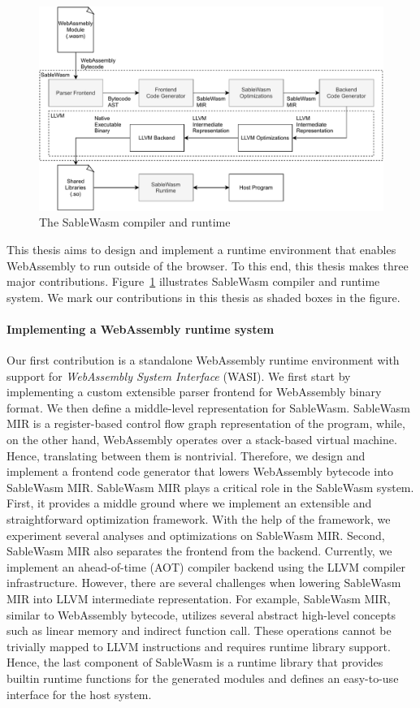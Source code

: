 \begin{figure}
    \centering
    \includegraphics[width=\textwidth]{Images/design}
    \caption{The SableWasm compiler and runtime}
    \label{fig:design}
\end{figure}

This thesis aims to design and implement a runtime environment that enables
WebAssembly to run outside of the browser. To this end, this thesis makes three
major contributions. Figure~\ref{fig:design} illustrates SableWasm compiler and
runtime system. We mark our contributions in this thesis as shaded boxes in the
figure.

\paragraph{Implementing a WebAssembly runtime system}
Our first contribution is a standalone WebAssembly runtime environment with
support for \emph{WebAssembly System Interface} (WASI). We first start by
implementing a custom extensible parser frontend for WebAssembly binary format.
We then define a middle-level representation for SableWasm. SableWasm MIR is a
register-based control flow graph representation of the program, while, on the
other hand, WebAssembly operates over a stack-based virtual machine. Hence,
translating between them is nontrivial. Therefore, we design and implement a
frontend code generator that lowers WebAssembly bytecode into SableWasm MIR.
SableWasm MIR plays a critical role in the SableWasm system. First, it provides
a middle ground where we implement an extensible and straightforward
optimization framework. With the help of the framework, we experiment several
analyses and optimizations on SableWasm MIR. Second, SableWasm MIR also
separates the frontend from the backend. Currently, we implement an
ahead-of-time (AOT) compiler backend using the LLVM compiler infrastructure.
However, there are several challenges when lowering SableWasm MIR into LLVM
intermediate representation. For example, SableWasm MIR, similar to WebAssembly
bytecode, utilizes several abstract high-level concepts such as linear memory
and indirect function call. These operations cannot be trivially mapped to LLVM
instructions and requires runtime library support. Hence, the last component of
SableWasm is a runtime library that provides builtin runtime functions for the
generated modules and defines an easy-to-use interface for the host system.

